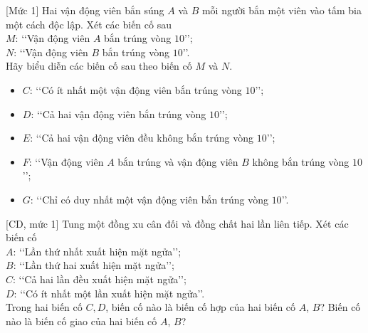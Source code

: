 \begin{bt}%
[Mức 1]
	Hai vận động viên bắn súng $A$ và $B$ mỗi người bắn một viên vào tấm bia một cách độc lập. Xét các biến  cố sau\\
	$M$: \lq\lq Vận động viên $A$ bắn trúng vòng $10$\rq\rq;\\
	$N$: \lq\lq Vận động viên $B$ bắn trúng vòng $10$\rq\rq.\\
	Hãy biểu diễn các biến cố sau theo biến cố $M$ và $N$.
	\begin{itemize}
		\item $C$: \lq\lq Có ít nhất một vận động viên bắn trúng vòng $10$\rq\rq;
		\item $D$: \lq\lq Cả hai vận động viên bắn trúng vòng $10$\rq\rq;
		\item $E$: \lq\lq Cả hai vận động viên đều không bắn trúng vòng $10$\rq\rq;
		\item $F$: \lq\lq Vận động viên $A$ bắn trúng và vận động viên $B$ không bắn trúng vòng $10$\rq\rq;
		\item  $G$: \lq\lq Chỉ có duy nhất một vận động viên bắn trúng vòng $10$\rq\rq.
	\end{itemize}
\end{bt}

\begin{bt}%
[CD, mức 1]%
	Tung một đồng xu cân đối và đồng chất hai lần liên tiếp. Xét các biến cố\\
	$A$: \lq\lq Lần thứ nhất xuất hiện mặt ngửa\rq\rq;\\
	$B$: \lq\lq Lần thứ hai xuất hiện mặt ngửa\rq\rq;\\
	$C$: \lq\lq Cả hai lần đều xuất hiện mặt ngửa\rq\rq;\\
	$D$: \lq\lq Có ít nhất một lần xuất hiện mặt ngửa\rq\rq.\\
	Trong hai biến cố $C, D$, biến cố nào là biến cố hợp của hai biến cố $A$, $B$? Biến cố nào là biến cố giao của hai biến cố $A$, $B$?
\end{bt}

